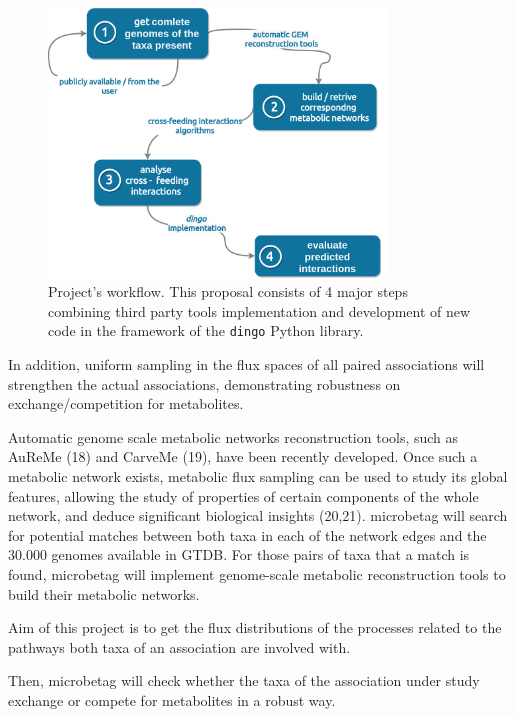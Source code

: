 \documentclass{article}
\begin{document}
\begin{figure}[h]
   \label{methods}
      \centering
      \includegraphics[width=0.8\textwidth]{proposal_steps.png}
      \caption{Project's workflow. This proposal consists of 4 major steps combining third party tools implementation and development of new code in the framework of the \texttt{dingo} Python library.}
   \end{figure}




In addition, uniform sampling in the flux spaces of all paired associations will strengthen the actual associations, demonstrating robustness on exchange/competition for metabolites. 


Automatic genome scale metabolic networks reconstruction tools, such as AuReMe (18) and CarveMe (19), have been recently developed. Once such a metabolic network exists, metabolic flux sampling can be used to study its global features, allowing the study of properties of certain components of the whole network, and deduce significant biological insights (20,21).
microbetag will search for potential matches between both taxa in each of the network edges and the 30.000 genomes available in GTDB. For those pairs of taxa that a match is found, microbetag will implement genome-scale metabolic reconstruction tools to build their metabolic networks. 


Aim of this project is to get the flux distributions of the processes related to the pathways both taxa of an association are involved with. 

Then, microbetag will check whether the taxa of the association under study exchange or compete for metabolites in a robust way.
\end{document}
